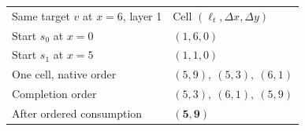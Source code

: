 \begin{tabular}{@{}ll@{}}
\toprule
Same target $v$ at $x=6$, layer 1 & Cell $(\ell_t,\Delta x,\Delta y)$\\
Start $s_0$ at $x=0$ & $(1,6,0)$\\
Start $s_1$ at $x=5$ & $(1,1,0)$\\\midrule
One cell, native order & $(5,9),\ (5,3),\ (6,1)$\\
Completion order & $(5,3),\ (6,1),\ (5,9)$\\
After ordered consumption & $\mathbf{(5,9)}$\\\bottomrule
\end{tabular}
